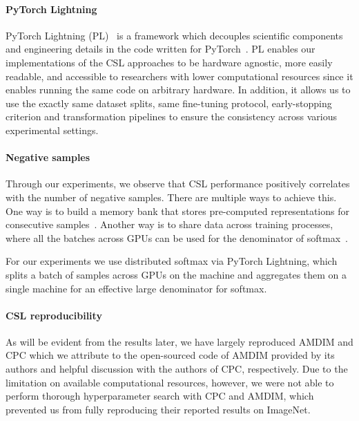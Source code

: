 \documentclass{article}
\begin{document}
\paragraph{PyTorch Lightning}

PyTorch Lightning (PL)~\cite{falcon2019pytorch} is a framework which decouples scientific components and engineering details in the code written for PyTorch~\cite{paszke2019pytorch}. PL enables our implementations of the CSL approaches to be hardware agnostic, more easily readable, and accessible to researchers with lower computational resources since it enables running the same code on arbitrary hardware. In addition, it allows us to use the exactly same dataset splits, same fine-tuning protocol, early-stopping criterion and transformation pipelines to ensure the consistency across various experimental settings.

\paragraph{Negative samples}

Through our experiments, we observe that CSL performance positively correlates with the number of negative samples. There are multiple ways to achieve this. One way is to build a memory bank that stores pre-computed representations for  consecutive samples~\cite{tian2019contrastive,chen2020simple}. Another way is to share data across training processes, where all the batches across GPUs can be used for the denominator of  softmax~\cite{falcon2019pytorch,miller2017parlai}.

For our experiments we use distributed softmax via PyTorch Lightning, which splits a batch of samples across GPUs on the machine and aggregates them on a single machine for an effective large denominator for softmax. 

\paragraph{CSL reproducibility}

As will be evident from the results later, we have largely reproduced AMDIM and CPC which we attribute to the open-sourced code of AMDIM provided by its authors and helpful discussion with the authors of CPC, respectively. Due to the limitation on available computational resources, however, we were not able to perform thorough hyperparameter search with CPC and AMDIM, which prevented us from fully reproducing their reported results on ImageNet.
\end{document}
